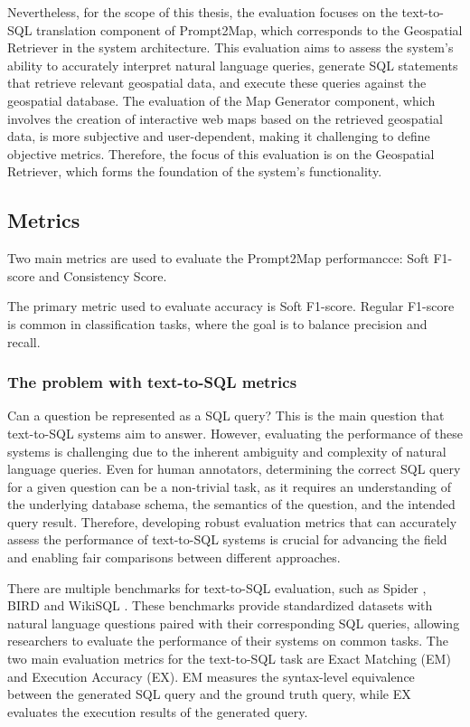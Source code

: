 Nevertheless, for the scope of this thesis, the evaluation focuses on the text-to-SQL translation component of Prompt2Map, which corresponds to the Geospatial Retriever in the system architecture. This evaluation aims to assess the system's ability to accurately interpret natural language queries, generate SQL statements that retrieve relevant geospatial data, and execute these queries against the geospatial database. The evaluation of the Map Generator component, which involves the creation of interactive web maps based on the retrieved geospatial data, is more subjective and user-dependent, making it challenging to define objective metrics. Therefore, the focus of this evaluation is on the Geospatial Retriever, which forms the foundation of the system's functionality.

\subsection{Metrics}

Two main metrics are used to evaluate the Prompt2Map performancce: Soft F1-score and Consistency Score.


The primary metric used to evaluate accuracy is Soft F1-score. Regular F1-score is common in classification tasks, where the goal is to balance precision and recall.

\subsubsection{The problem with text-to-SQL metrics}

Can a question be represented as a SQL query? This is the main question that text-to-SQL systems aim to answer. However, evaluating the performance of these systems is challenging due to the inherent ambiguity and complexity of natural language queries. Even for human annotators, determining the correct SQL query for a given question can be a non-trivial task, as it requires an understanding of the underlying database schema, the semantics of the question, and the intended query result. Therefore, developing robust evaluation metrics that can accurately assess the performance of text-to-SQL systems is crucial for advancing the field and enabling fair comparisons between different approaches.

There are multiple benchmarks for text-to-SQL evaluation, such as Spider \cite{yu_spider_2018}, BIRD \cite{li_can_2023} and WikiSQL \cite{zhongSeq2SQL2017}. These benchmarks provide standardized datasets with natural language questions paired with their corresponding SQL queries, allowing researchers to evaluate the performance of their systems on common tasks. The two main evaluation metrics for the text-to-SQL task are Exact Matching (EM) and Execution Accuracy (EX). EM measures the syntax-level equivalence between the generated SQL query and the ground truth query, while EX evaluates the execution results of the generated query.

